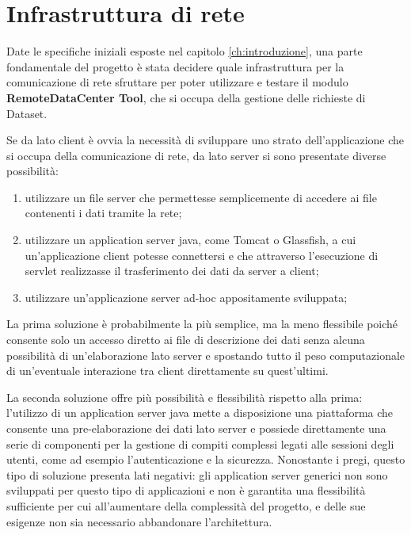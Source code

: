 \section{Infrastruttura di rete} 
\label{sec:rete}
Date le specifiche iniziali esposte nel capitolo \ref{ch:introduzione}, una parte fondamentale del progetto \`e stata decidere quale infrastruttura per la comunicazione di rete sfruttare per poter utilizzare e testare il modulo \textbf{RemoteDataCenter Tool}, che si occupa della gestione delle richieste di Dataset.

Se da lato client \`e ovvia la necessit\`a di sviluppare uno strato dell'applicazione che si occupa della comunicazione di rete, da lato server si sono presentate diverse possibilit\`a: 

\begin{enumerate}
	\item  utilizzare un file server che permettesse semplicemente di accedere ai file contenenti i dati tramite la rete;
	\item  utilizzare un application server java, come Tomcat o Glassfish, a cui un'applicazione client potesse connettersi e che attraverso l'esecuzione di servlet realizzasse il trasferimento dei dati da server a client;
	\item  utilizzare un'applicazione server ad-hoc appositamente sviluppata;
\end{enumerate}

La prima soluzione \`e probabilmente la pi\`u semplice, ma la meno flessibile poich\'e consente solo un accesso diretto ai file di descrizione dei dati senza alcuna possibilit\`a di un'elaborazione lato server e spostando tutto il peso computazionale di un'eventuale interazione tra client direttamente su quest'ultimi.

La seconda soluzione offre pi\`u possibilit\`a e flessibilit\`a rispetto alla prima: l'utilizzo di un application server java mette a disposizione una piattaforma che consente una pre-elaborazione dei dati lato server e possiede direttamente una serie di componenti per la gestione di compiti complessi legati alle sessioni degli utenti, come ad esempio l'autenticazione e la sicurezza. 
Nonostante i pregi, questo tipo di soluzione presenta lati negativi: gli application server generici non sono sviluppati per questo tipo di applicazioni e non \`e garantita una flessibilit\`a sufficiente per cui all'aumentare della complessit\`a del progetto, e delle sue esigenze non sia necessario abbandonare l'architettura. 

